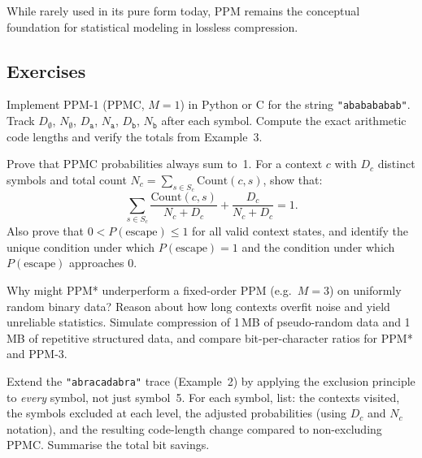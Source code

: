 While rarely used in its pure form today, PPM remains the conceptual foundation 
for statistical modeling in lossless compression.

\subsection*{Exercises}

\begin{exercisebox}
Implement PPM-1 (PPMC, $M=1$) in Python or C for the string
\texttt{"ababababab"}. Track $D_{\emptyset}$, $N_{\emptyset}$, $D_{\texttt{a}}$, 
$N_{\texttt{a}}$, $D_{\texttt{b}}$, $N_{\texttt{b}}$ after each symbol. Compute 
the exact arithmetic code lengths and verify the totals from Example~3.
\end{exercisebox}

\begin{exercisebox}
Prove that PPMC probabilities always sum to~1. For a context $c$ with $D_c$ distinct 
symbols and total count $N_c = \sum_{s \in S_c} \text{Count}(c,s)$, show that:
\[
    \sum_{s \in S_c} \frac{\text{Count}(c,s)}{N_c + D_c} + \frac{D_c}{N_c + D_c} = 1.
\]
Also prove that $0 < P(\text{escape}) \leq 1$ for all valid context states, and 
identify the unique condition under which $P(\text{escape}) = 1$ and the condition 
under which $P(\text{escape})$ approaches 0.
\end{exercisebox}

\begin{exercisebox}
Why might PPM* underperform a fixed-order PPM (e.g.\ $M=3$) on uniformly random
binary data? Reason about how long contexts overfit noise and yield unreliable
statistics. Simulate compression of 1\,MB of pseudo-random data and 1\,MB of
repetitive structured data, and compare bit-per-character ratios for PPM* and
PPM-3.
\end{exercisebox}

\begin{exercisebox}
Extend the \texttt{"abracadabra"} trace (Example~2) by applying the exclusion
principle to \emph{every} symbol, not just symbol~5. For each symbol, list: the
contexts visited, the symbols excluded at each level, the adjusted probabilities
(using $D_c$ and $N_c$ notation), and the resulting code-length change compared 
to non-excluding PPMC. Summarise the total bit savings.
\end{exercisebox}

